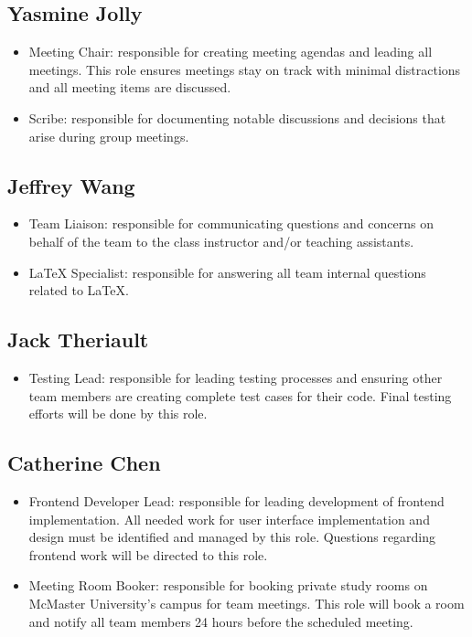 \documentclass{article}
\begin{document}
\subsection{Yasmine Jolly}

\begin{itemize}
	\item Meeting Chair: responsible for creating meeting agendas and leading all meetings. This role ensures meetings stay on track with minimal distractions and all meeting items are discussed. 
	\item Scribe: responsible for documenting notable discussions and decisions that arise during group meetings.
\end{itemize}

\subsection{Jeffrey Wang}

\begin{itemize}
	\item Team Liaison: responsible for communicating questions and concerns on behalf of the team to the class instructor and/or teaching assistants. 
	\item LaTeX Specialist: responsible for answering all team internal questions related to LaTeX. 
\end{itemize}

\subsection{Jack Theriault}

\begin{itemize}
	\item Testing Lead: responsible for leading testing processes and ensuring other team members are creating complete test cases for their code. Final testing efforts will be done by this role.
\end{itemize}

\subsection{Catherine Chen}

\begin{itemize}
	\item Frontend Developer Lead: responsible for leading development of frontend implementation. All needed work for user interface implementation and design must be identified and managed by this role. Questions regarding frontend work will be directed to this role.
	\item Meeting Room Booker: responsible for booking private study rooms on McMaster University's campus for team meetings. This role will book a room and notify all team members 24 hours before the scheduled meeting.
\end{itemize}
\end{document}
